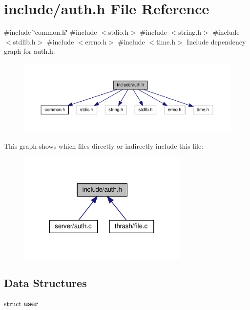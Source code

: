 \section{include/auth.h File Reference}
\label{auth_8h}
{\ttfamily \#include \char`\"{}common.\+h\char`\"{}}\newline
{\ttfamily \#include $<$stdio.\+h$>$}\newline
{\ttfamily \#include $<$string.\+h$>$}\newline
{\ttfamily \#include $<$stdlib.\+h$>$}\newline
{\ttfamily \#include $<$errno.\+h$>$}\newline
{\ttfamily \#include $<$time.\+h$>$}\newline
Include dependency graph for auth.\+h\+:\nopagebreak
\begin{figure}[H]
\begin{center}
\leavevmode
\includegraphics[width=350pt]{auth_8h__incl}
\end{center}
\end{figure}
This graph shows which files directly or indirectly include this file\+:\nopagebreak
\begin{figure}[H]
\begin{center}
\leavevmode
\includegraphics[width=240pt]{auth_8h__dep__incl}
\end{center}
\end{figure}
\subsection*{Data Structures}
\begin{DoxyCompactItemize}
\item 
struct \textbf{ user}
\end{DoxyCompactItemize}
